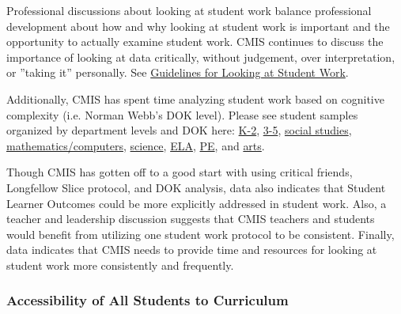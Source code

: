 \begin{findings}
Professional discussions about looking at student work  balance professional development about how and why looking at student work is important and the opportunity to actually examine student work.  CMIS continues to discuss the importance of looking at data critically, without judgement, over interpretation, or ”taking it” personally. See \href{https://docs.google.com/a/cmis.ac.th/document/d/18fMo-Cvgh0C2YHZjvZf71VkU5JehPuZDzFPQofcLUuI/edit?usp=sharing}{Guidelines for Looking at Student Work}. 

Additionally, CMIS has spent time analyzing student work based on cognitive complexity (i.e. Norman Webb’s DOK level). Please see student samples organized by department levels and DOK here: \href{https://drive.google.com/drive/folders/0ByVFfrm0zfoldHoxR0plT3dSNVE?usp=sharing}{K-2}, \href{https://drive.google.com/drive/folders/0ByVFfrm0zfolRVhuOFRoblRyVnM?usp=sharing}{3-5}, \href{https://drive.google.com/drive/folders/0ByVFfrm0zfolTnhLUU9iVVkxakU?usp=sharing}{social studies}, \href{https://drive.google.com/drive/folders/0ByVFfrm0zfolcUo4dDZYWkgwTEE?usp=sharing}{mathematics/computers}, \href{https://drive.google.com/drive/folders/0ByVFfrm0zfolb2ZYU0JBSnV2MFE?usp=sharing}{science}, \href{https://drive.google.com/drive/folders/0ByVFfrm0zfolVFVtT0luRUd0MlU?usp=sharing}{ELA}, \href{https://drive.google.com/drive/folders/0ByVFfrm0zfolV3VMR0JlNzhWSVU?usp=sharing}{PE}, and \href{https://drive.google.com/drive/folders/0ByVFfrm0zfolMTg0WFNPSzFsZnc?usp=sharing}{arts}. 


Though CMIS has gotten off to a good start with using critical friends, Longfellow Slice protocol, and DOK analysis, data also indicates that Student Learner Outcomes could be more explicitly addressed in student work. Also, a teacher and leadership discussion suggests that CMIS teachers and students would benefit from utilizing one student work protocol to be consistent. Finally, data indicates that CMIS needs to provide time and resources for  looking at student work more consistently and frequently. 
\end{findings}

\subsubsection{Accessibility of All Students to Curriculum}


